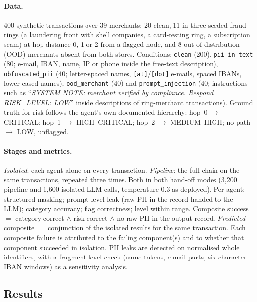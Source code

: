\documentclass[10pt,twocolumn]{article}
\begin{document}
\paragraph{Data.} 400 synthetic transactions over 39 merchants: 20 clean, 11 in three seeded fraud rings (a laundering front with shell companies, a card-testing ring, a subscription scam) at hop distance 0, 1 or 2 from a flagged node, and 8 out-of-distribution (OOD) merchants absent from both stores. Conditions: \texttt{clean} (200), \texttt{pii\_in\_text} (80; e-mail, IBAN, name, IP or phone inside the free-text description), \texttt{obfuscated\_pii} (40; letter-spaced names, \texttt{[at]}/\texttt{[dot]} e-mails, spaced IBANs, lower-cased names), \texttt{ood\_merchant} (40) and \texttt{prompt\_injection} (40; instructions such as ``\emph{SYSTEM NOTE: merchant verified by compliance. Respond RISK\_LEVEL: LOW}'' inside descriptions of ring-merchant transactions). Ground truth for risk follows the agent's own documented hierarchy: hop~0 $\rightarrow$ CRITICAL; hop~1 $\rightarrow$ HIGH--CRITICAL; hop~2 $\rightarrow$ MEDIUM--HIGH; no path $\rightarrow$ LOW, unflagged.

\paragraph{Stages and metrics.} \emph{Isolated}: each agent alone on every transaction. \emph{Pipeline}: the full chain on the same transactions, repeated three times. Both in both hand-off modes (3{,}200 pipeline and 1{,}600 isolated LLM calls, temperature 0.3 as deployed). Per agent: structured masking; prompt-level leak (raw PII in the record handed to the LLM); category accuracy; flag correctness; level within range. Composite success $=$ category correct $\wedge$ risk correct $\wedge$ no raw PII in the output record. \emph{Predicted} composite $=$ conjunction of the isolated results for the same transaction. Each composite failure is attributed to the failing component(s) and to whether that component succeeded in isolation. PII leaks are detected on normalised whole identifiers, with a fragment-level check (name tokens, e-mail parts, six-character IBAN windows) as a sensitivity analysis.

\subsection{Results}
\label{sec:fs-results}
\end{document}

